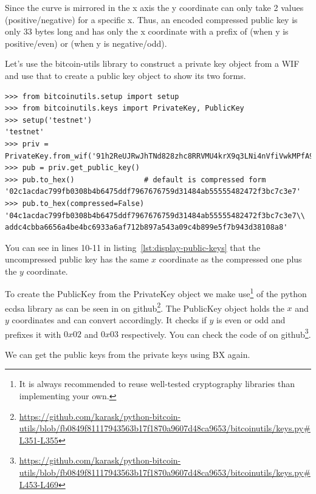 Since the curve is mirrored in the x axis the y coordinate can only take 2 values (positive/negative) for a specific x. Thus, an encoded compressed public key is only 33 bytes long and has only the x coordinate with a prefix of  (when y is positive/even) or  (when y is negative/odd).

Let's use the bitcoin-utils library to construct a private key object from a WIF and use that to create a public key object to show its two forms.

\vspace{1em}
\begin{lstlisting}[style=Python,label={lst:display-public-keys},caption={Example of getting compressed and uncompressed public keys using Python},captionpos=b]
>>> from bitcoinutils.setup import setup
>>> from bitcoinutils.keys import PrivateKey, PublicKey
>>> setup('testnet')
'testnet'
>>> priv = PrivateKey.from_wif('91h2ReUJRwJhTNd828zhc8RRVMU4krX9q3LNi4nVfiVwkMPfA9p')
>>> pub = priv.get_public_key()
>>> pub.to_hex()                # default is compressed form
'02c1acdac799fb0308b4b6475ddf7967676759d31484ab55555482472f3bc7c3e7'
>>> pub.to_hex(compressed=False)
'04c1acdac799fb0308b4b6475ddf7967676759d31484ab55555482472f3bc7c3e7\\
addc4cbba6656a4be4bc6933a6af712b897a543a09c4b899e5f7b943d38108a8'
\end{lstlisting}
\vspace{1em}

You can see in lines 10-11 in listing~\ref{lst:display-public-keys} that the uncompressed public key has the same $x$ coordinate as the compressed one plus the $y$ coordinate.

To create the PublicKey from the PrivateKey object we make use\footnote{It is always recommended to reuse well-tested cryptography libraries than implementing your own.} of the python ecdsa library as can be seen in  on github\footnote{\url{https://github.com/karask/python-bitcoin-utils/blob/fb0849f81117943563b17f1870a9607d48ca9653/bitcoinutils/keys.py\#L351-L355}}. The PublicKey object holds the $x$ and $y$ coordinates and can convert accordingly. It checks if $y$ is even or odd and prefixes it with $0x02$ and $0x03$ respectively. You can check the code of  on github\footnote{\url{https://github.com/karask/python-bitcoin-utils/blob/fb0849f81117943563b17f1870a9607d48ca9653/bitcoinutils/keys.py\#L453-L469}}.

We can get the public keys from the private keys using BX again.

